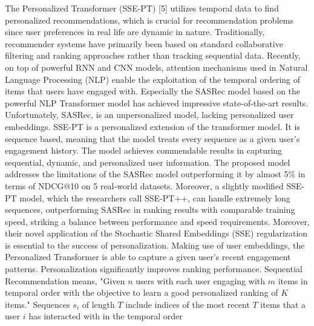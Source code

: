 The Personalized Transformer (SSE-PT) [5] utilizes temporal data to find personalized recommendations, which is crucial for recommendation problems since user preferences in real life are dynamic in nature. Traditionally, recommender systems have primarily been based on standard collaborative filtering and ranking approaches rather than tracking sequential data. Recently, on top of powerful RNN and CNN models, attention mechanisms used in Natural Language Processing (NLP) enable the exploitation of the temporal ordering of items that users have engaged with. 
Especially the SASRec model based on the powerful NLP Transformer model has achieved impressive state-of-the-art results. Unfortunately, SASRec, is an unpersonalized model, lacking personalized user embeddings. SSE-PT is a personalized extension of the transformer model. It is sequence based, meaning that the model treats every sequence  as a given user's engagement history. The model achieves commendable results in capturing sequential, dynamic, and personalized user information. The proposed model addresses the limitations of the SASRec model outperforming it by almost 5$\%$ in terms of NDCG@10 on 5 real-world datasets. Moreover, a slightly modified SSE-PT model, which the researchers call SSE-PT++, can handle extremely long sequences, outperforming SASRec in ranking results with comparable training speed, striking a balance between performance and speed requirements. Moreover, their novel application of the Stochastic Shared Embeddings (SSE) regularization is essential to the success of personalization. Making use of user embeddings, the Personalized Transformer is able to capture a given user's recent engagement patterns. Personalization significantly improves ranking performance.
Sequential Recommendation means, "Given $n$ users with each user engaging with $m$ items in temporal order with the objective to learn a good personalized ranking of $K$ items." Sequences $s_i$ of length $T$ include indices of the most recent $T$ items that a user $i$ has interacted with in the temporal order

